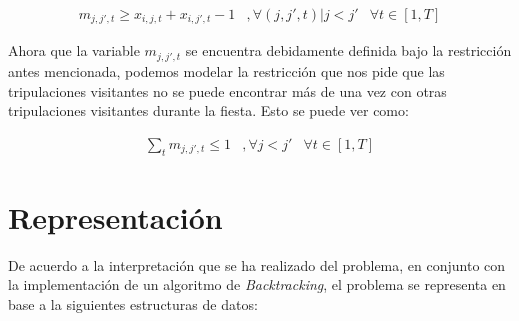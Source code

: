\documentclass[letter, 10pt]{article}
\begin{document}
\begin{eqnarray}
m_{j,j',t} \geq x_{i,j,t} + x_{i,j',t} - 1 & , \forall(j,j',t)|j<j'& \forall t \in [1,T]
\end{eqnarray}

Ahora que la variable $m_{j,j',t}$ se encuentra debidamente definida bajo la restricción antes mencionada, podemos modelar la restricción que nos pide que las tripulaciones visitantes no se puede encontrar más de una vez con otras tripulaciones visitantes durante la fiesta. Esto se puede ver como:

\begin{eqnarray}
\sum_t m_{j,j',t} \leq 1 & , \forall j<j'& \forall t \in [1,T]
\end{eqnarray}

\section{Representación}
De acuerdo a la interpretación que se ha realizado del problema, en conjunto con la implementación de un algoritmo de \textit{Backtracking}, el problema se representa en base a la siguientes estructuras de datos:
\end{document}
